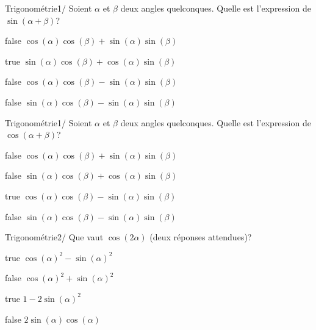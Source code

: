         	\begin{question}{47}{Trigonométrie}{1}{/}
				Soient $\alpha$ et $\beta$ deux angles quelconques. Quelle est l'expression de $\sin(\alpha+\beta)$?
            \end{question}
            \begin{reponses}
            	\item[false] $\cos(\alpha)\cos(\beta)+\sin(\alpha)\sin(\beta)$
            	\item[true] $\sin(\alpha)\cos(\beta)+\cos(\alpha)\sin(\beta)$
                \item[false] $\cos(\alpha)\cos(\beta)-\sin(\alpha)\sin(\beta)$
                \item[false] $\sin(\alpha)\cos(\beta)-\sin(\alpha)\sin(\beta)$
            \end{reponses}
        	\begin{question}{47}{Trigonométrie}{1}{/}
				Soient $\alpha$ et $\beta$ deux angles quelconques. Quelle est l'expression de $\cos(\alpha+\beta)$?
            \end{question}
            \begin{reponses}
            	\item[false] $\cos(\alpha)\cos(\beta)+\sin(\alpha)\sin(\beta)$
            	\item[false] $\sin(\alpha)\cos(\beta)+\cos(\alpha)\sin(\beta)$
                \item[true] $\cos(\alpha)\cos(\beta)-\sin(\alpha)\sin(\beta)$
                \item[false] $\sin(\alpha)\cos(\beta)-\sin(\alpha)\sin(\beta)$
            \end{reponses}
            \begin{question}{47}{Trigonométrie}{2}{/}
            	Que vaut $\cos(2\alpha)$ (deux réponses attendues)?
            \end{question}
            \begin{reponses}
                \item[true] $\cos(\alpha)^2-\sin(\alpha)^2$
                \item[false] $\cos(\alpha)^2+\sin(\alpha)^2$
                \item[true] $1-2\sin(\alpha)^2$
                \item[false] $2\sin(\alpha)\cos(\alpha)$
            \end{reponses}
